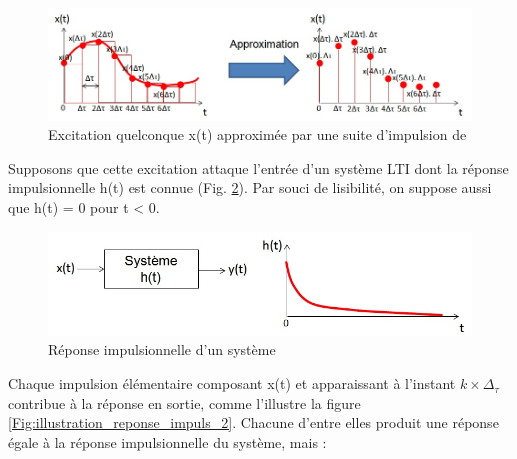 	\begin{figure}[htbp]
          \centering
          \includegraphics[scale=0.5]{images/Approx_excitation_Dirac.jpg}
          \caption{Excitation quelconque x(t) approximée par une suite
            d'impulsion de \Dirac}
          \label{Fig:Approx_excitation_Dirac}
	\end{figure}
	Supposons que cette excitation attaque l'entrée d'un système
        LTI dont la réponse impulsionnelle h(t) est connue
        (Fig. \ref{Fig:reponse_impuls_illustration}). Par souci de
        lisibilité, on suppose aussi que h(t) = 0 pour t < 0.
	\begin{figure}[htbp]
          \centering
          \includegraphics[scale=0.5]{images/reponse_impuls_illustration.jpg}
          \caption{Réponse impulsionnelle d'un système}
          \label{Fig:reponse_impuls_illustration}
	\end{figure}
	
	Chaque impulsion élémentaire composant x(t) et apparaissant à
        l'instant $ k \times \Delta_\tau $ contribue à la réponse en
        sortie, comme l'illustre la figure
        \ref{Fig:illustration_reponse_impuls_2}. Chacune d'entre elles
        produit une réponse égale à la réponse impulsionnelle du
        système, mais :
	
